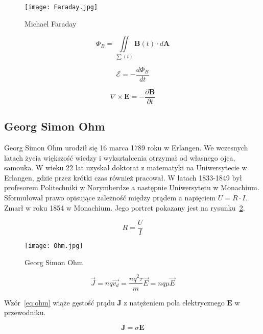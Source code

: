 \begin{figure}[!ht]
	\centering \texttt{[image: Faraday.jpg]}
	\caption{Michael Faraday}
	\label{rys:faraday}
\end{figure}

\begin{equation*}
    \Phi_B = \iint\limits_{\sum (t)} \pmb{B}(t) \cdot d\pmb{A}
\end{equation*}

\begin{equation}
    \mathcal{E} = -\frac{d\Phi_B}{dt}
\end{equation}

 \begin{equation}
     \nabla \times \pmb{E} = - \frac{\partial \pmb{B}}{\partial t}
 \end{equation}


\subsection{Georg Simon Ohm}
Georg Simon Ohm urodził się 16 marca 1789 roku w Erlangen. We wczesnych latach życia większość wiedzy i wykształcenia otrzymał od własnego ojca, samouka. W wieku 22 lat uzyskał doktorat z matematyki na Uniwersytecie w Erlangen, gdzie przez krótki czas również pracował. W latach 1833-1849 był profesorem Politechniki w Norymberdze a następnie Uniwersytetu w Monachium. Sformułował prawo opisujące zależność między prądem a napięciem $U=R \cdot I$. Zmarł w roku 1854 w Monachium. Jego portret pokazany jest na rysunku~\ref{rys:ohm}.

\begin{equation}
    R = \frac{U}{I}
\end{equation}

\begin{figure}[!h]
	\centering \texttt{[image: Ohm.jpg]}
	\caption{Georg Simon Ohm}
	\label{rys:ohm}
\end{figure}

\begin{equation*}
    \vec{J} = nq \vec{v_d} =  \frac{nq^2 \tau}{m} \vec{E} = nq \mu \vec{E}    
\end{equation*}
 
Wzór~\ref{eq:ohm} wiąże gęstość prądu $\pmb{J}$ z natężeniem pola elektrycznego $\pmb{E}$ w przewodniku.
 
\begin{equation}
    \pmb{J} = \sigma \pmb{E}
    \label{eq:ohm}
\end{equation}


